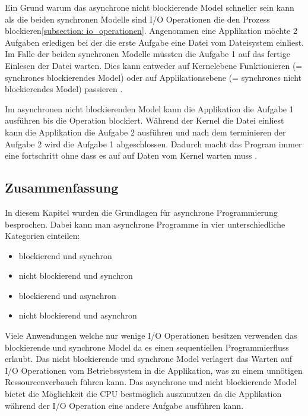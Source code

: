 Ein Grund warum das asynchrone nicht blockierende Model schneller sein kann als die beiden synchronen Modelle sind I/O Operationen die den Prozess blockieren\ref{subsection: io_operationen}. Angenommen eine Applikation möchte 2 Aufgaben erledigen bei der die erste Aufgabe eine Datei vom Dateisystem einliest. Im Falle der beiden synchronen Modelle müssten die Aufgabe 1 auf das fertige Einlesen der Datei warten. Dies kann entweder auf Kernelebene Funktionieren (= synchrones blockierendes Model) oder auf Applikationsebene (= synchrones nicht blockierendes Model) passieren \cite[]{Pet2015}. 

Im asynchronen nicht blockierenden Model kann die Applikation die Aufgabe 1 ausführen bis die Operation blockiert. Während der Kernel die Datei einliest kann die Applikation die Aufgabe 2 ausführen und nach dem terminieren der Aufgabe 2 wird die Aufgabe 1 abgeschlossen. Dadurch macht das Program immer eine fortschritt ohne dass es auf auf Daten vom Kernel warten muss \cite[]{Pet2015}.


\subsection{Zusammenfassung}

In diesem Kapitel wurden die Grundlagen für asynchrone Programmierung besprochen. Dabei kann man asynchrone Programme in vier unterschiedliche Kategorien einteilen:

\begin{itemize}
  \item blockierend und synchron
  \item nicht blockierend und synchron
  \item blockierend und asynchron
  \item nicht blockierend und asynchron
\end{itemize}    
Viele Anwendungen welche nur wenige I/O Operationen besitzen verwenden das blockierende und synchrone Model da es einen sequentiellen Programmierfluss erlaubt. Das nicht blockierende und synchrone Model verlagert das Warten auf I/O Operationen vom Betriebssystem in die Applikation, was zu einem unnötigen Ressourcenverbauch führen kann. Das asynchrone und nicht blockierende Model bietet die Möglichkeit die CPU bestmöglich auszunutzen da die Applikation während der I/O Operation eine andere Aufgabe ausführen kann.